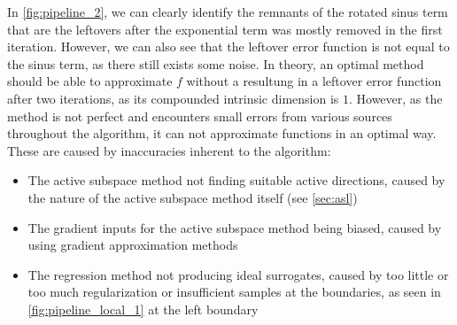 \documentclass[
  a4paper,  %
  twoside,  %
  bibliography=totoc,
  headsepline,
  cleardoublepage=empty,
  parskip=half,
  draft=false
]{scrbook}
\begin{document}
%
In \cref{fig:pipeline_2}, we can clearly identify the remnants of the rotated sinus term that are the leftovers after the exponential term was mostly removed in the first iteration.
However, we can also see that the leftover error function is not equal to the sinus term, as there still exists some noise.
In theory, an optimal method should be able to approximate $f$ without a resultung in a leftover error function after two iterations, as its compounded intrinsic dimension is $1$.
However, as the method is not perfect and encounters small errors from various sources throughout the algorithm, it can not approximate functions in an optimal way.
These are caused by inaccuracies inherent to the algorithm:
\begin{itemize}
\item The active subspace method not finding suitable active directions, caused by the nature of the active subspace method itself (see \cref{sec:asl})
\item The gradient inputs for the active subspace method being biased, caused by using gradient approximation methods
\item The regression method not producing ideal surrogates, caused by too little or too much regularization or insufficient samples at the boundaries, as seen in \cref{fig:pipeline_local_1} at the left boundary
\end{itemize}
\end{document}
